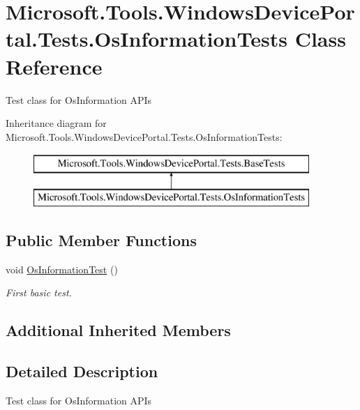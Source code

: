 \hypertarget{class_microsoft_1_1_tools_1_1_windows_device_portal_1_1_tests_1_1_os_information_tests}{}\section{Microsoft.\+Tools.\+Windows\+Device\+Portal.\+Tests.\+Os\+Information\+Tests Class Reference}
\label{class_microsoft_1_1_tools_1_1_windows_device_portal_1_1_tests_1_1_os_information_tests}


Test class for Os\+Information A\+P\+Is  


Inheritance diagram for Microsoft.\+Tools.\+Windows\+Device\+Portal.\+Tests.\+Os\+Information\+Tests\+:\begin{figure}[H]
\begin{center}
\leavevmode
\includegraphics[height=2.000000cm]{class_microsoft_1_1_tools_1_1_windows_device_portal_1_1_tests_1_1_os_information_tests}
\end{center}
\end{figure}
\subsection*{Public Member Functions}
\begin{DoxyCompactItemize}
\item 
void \hyperlink{class_microsoft_1_1_tools_1_1_windows_device_portal_1_1_tests_1_1_os_information_tests_a373fcd62b8b0cb85996cb7ec2adc91a4}{Os\+Information\+Test} ()
\begin{DoxyCompactList}\small\item\em First basic test. \end{DoxyCompactList}\end{DoxyCompactItemize}
\subsection*{Additional Inherited Members}


\subsection{Detailed Description}
Test class for Os\+Information A\+P\+Is 



